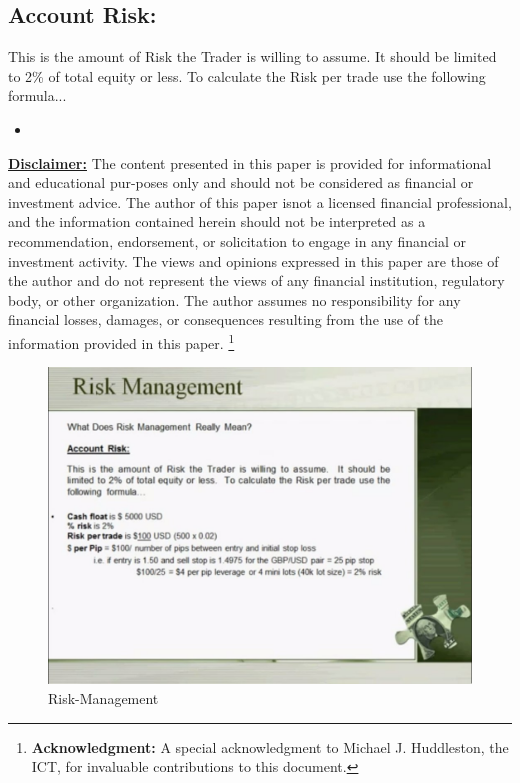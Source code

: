 \documentclass[10pt] {article}
\begin{document}
\subsection{Account Risk:}
This is the amount of Risk the Trader is willing to assume. It should be limited to 2\% of total equity or less. To calculate the Risk per trade use the following formula...

\begin{itemize}
    \item 
\end{itemize}

\vspace{11cm}
\noindent \textbf{\underline{Disclaimer:}}
\small{The content presented in this paper is provided for informational and educational pur-poses only and should not be considered as financial or investment advice. The author of this paper isnot a licensed financial professional, and the information contained herein should not be interpreted as a recommendation, endorsement, or solicitation to engage in any financial or investment activity. The views and opinions expressed in this paper are those of the author and do not represent the views of any financial institution, regulatory body, or other organization. The author assumes no responsibility for any financial losses, damages, or consequences resulting from the use of the information provided in this paper.}
\footnote{
  \textbf{Acknowledgment:} A special acknowledgment to Michael J. Huddleston, the ICT, for invaluable contributions to this document.}

\newpage

\begin{center}
\end{center}

\begin{figure}[h]
    \centering
    \includegraphics[width=1\textwidth]{./figures/Rsik_management.jpg}
    \caption{Risk-Management}
\end{figure}
\end{document}
